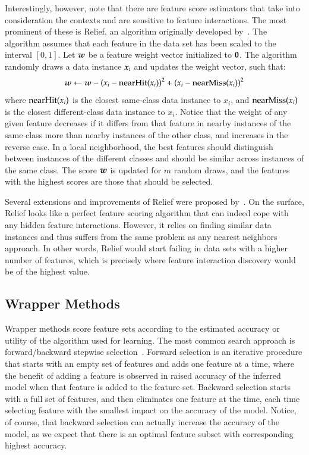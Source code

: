 \begin{refsection}
Interestingly, however, note that there are feature score estimators that take into consideration the contexts and are sensitive to feature interactions. The most prominent of these is Relief, an algorithm originally developed by~\citet{Kira1992}. The algorithm assumes that each feature in the data set has been scaled to the interval $[0,1]$. Let $\boldsymbol{w}$ be a feature weight vector initialized to $\boldsymbol{0}$. The algorithm randomly draws a data instance $\boldsymbol{x}_i$ and updates the weight vector, such that:
$$
\boldsymbol{w}\gets\boldsymbol{w}-\left(x_i - {\rm nearHit}(x_i)\right)^2 + \left(x_i - {\rm nearMiss}(x_i)\right)^2
$$
where ${\rm nearHit}(x_i)$ is the closest same-class data instance to $x_i$, and ${\rm nearMiss}(x_i)$ is the closest different-class data instance to $x_i$. Notice that the weight of any given feature decreases if it differs from that feature in nearby instances of the same class more than nearby instances of the other class, and increases in the reverse case. In a local neighborhood, the best features should distinguish between instances of the different classes and should be similar across instances of the same class. The score $\boldsymbol{w}$ is updated for $m$ random draws, and the features with the highest scores are those that should be selected. 

Several extensions and improvements of Relief were proposed by~\citep{Kononenko1997}. On the surface, Relief looks like a perfect feature scoring algorithm that can indeed cope with any hidden feature interactions. However, it relies on finding similar data instances and thus suffers from the same problem as any nearest neighbors approach. In other words, Relief would start failing in data sets with a higher number of features, which is precisely where feature interaction discovery would be of the highest value.

\subsection*{Wrapper Methods}

Wrapper methods score feature sets according to the estimated accuracy or utility of the algorithm used for learning. The most common search approach is forward/backward stepwise selection~\citep{Guyon2003}. Forward selection is an iterative procedure that starts with an empty set of features and adds one feature at a time, where the benefit of adding a feature is observed in raised accuracy of the inferred model when that feature is added to the feature set. Backward selection starts with a full set of features, and then eliminates one feature at the time, each time selecting feature with the smallest impact on the accuracy of the model. Notice, of course, that backward selection can actually increase the accuracy of the model, as we expect that there is an optimal feature subset with corresponding highest accuracy.


\end{refsection}
